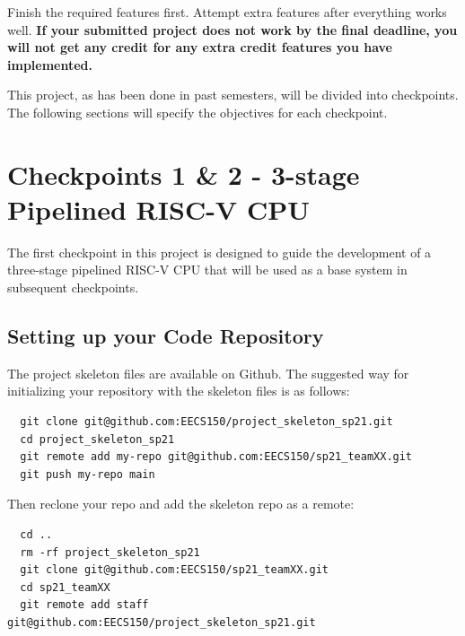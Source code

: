 \documentclass[11pt]{article}
\begin{document}
Finish the required features first.
Attempt extra features after everything works well.
\textbf{If your submitted project does not work by the final deadline, you will not get any credit for any extra credit features you have implemented.}

This project, as has been done in past semesters, will be divided into checkpoints. The following sections will specify the objectives for each checkpoint.

\section{Checkpoints 1 \& 2 - 3-stage Pipelined RISC-V CPU}
The first checkpoint in this project is designed to guide the development of a three-stage pipelined RISC-V CPU that will be used as a base system in subsequent checkpoints.



\subsection{Setting up your Code Repository}
The project skeleton files are available on Github.
The suggested way for initializing your repository with the skeleton files is as follows:

\begin{verbatim}
  git clone git@github.com:EECS150/project_skeleton_sp21.git
  cd project_skeleton_sp21
  git remote add my-repo git@github.com:EECS150/sp21_teamXX.git
  git push my-repo main
\end{verbatim}

Then reclone your repo and add the skeleton repo as a remote:
\begin{verbatim}
  cd ..
  rm -rf project_skeleton_sp21
  git clone git@github.com:EECS150/sp21_teamXX.git
  cd sp21_teamXX
  git remote add staff git@github.com:EECS150/project_skeleton_sp21.git
\end{verbatim}
\end{document}
